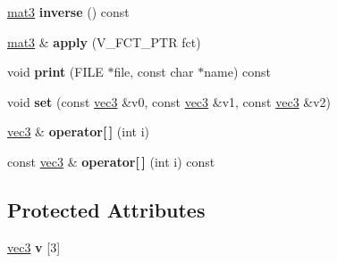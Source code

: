 \begin{DoxyCompactItemize}
\item 
\hypertarget{classmat3_a4668ed7cda236044eaa7a4d77f569432}{\hyperlink{classmat3}{mat3} {\bfseries inverse} () const }\label{classmat3_a4668ed7cda236044eaa7a4d77f569432}

\item 
\hypertarget{classmat3_af9bebf7319a26dd99cf7cdb9212e419f}{\hyperlink{classmat3}{mat3} \& {\bfseries apply} (V\-\_\-\-F\-C\-T\-\_\-\-P\-T\-R fct)}\label{classmat3_af9bebf7319a26dd99cf7cdb9212e419f}

\item 
\hypertarget{classmat3_a36d397e7b54f70c67a74bc1cfb3d11e8}{void {\bfseries print} (F\-I\-L\-E $\ast$file, const char $\ast$name) const }\label{classmat3_a36d397e7b54f70c67a74bc1cfb3d11e8}

\item 
\hypertarget{classmat3_aaaf37c4e57c58e42bf2b10cb3798ad50}{void {\bfseries set} (const \hyperlink{classvec3}{vec3} \&v0, const \hyperlink{classvec3}{vec3} \&v1, const \hyperlink{classvec3}{vec3} \&v2)}\label{classmat3_aaaf37c4e57c58e42bf2b10cb3798ad50}

\item 
\hypertarget{classmat3_ae44b2c7da5e1d0fa87b30d7d00f4e4f3}{\hyperlink{classvec3}{vec3} \& {\bfseries operator\mbox{[}$\,$\mbox{]}} (int i)}\label{classmat3_ae44b2c7da5e1d0fa87b30d7d00f4e4f3}

\item 
\hypertarget{classmat3_a5347c8208eb43b251b6bd779af3da963}{const \hyperlink{classvec3}{vec3} \& {\bfseries operator\mbox{[}$\,$\mbox{]}} (int i) const }\label{classmat3_a5347c8208eb43b251b6bd779af3da963}

\end{DoxyCompactItemize}
\subsection*{Protected Attributes}
\begin{DoxyCompactItemize}
\item 
\hypertarget{classmat3_a6ea9325bd4f99b8bf81868b87f626b6b}{\hyperlink{classvec3}{vec3} {\bfseries v} \mbox{[}3\mbox{]}}\label{classmat3_a6ea9325bd4f99b8bf81868b87f626b6b}

\end{DoxyCompactItemize}
